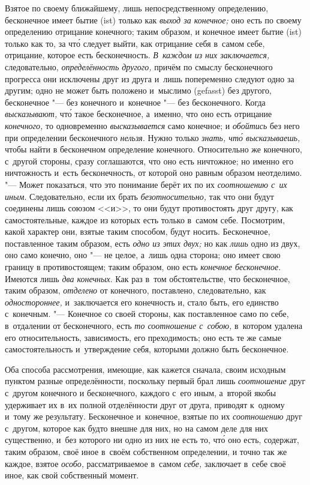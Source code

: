 Взятое по своему ближайшему, лишь непосредственному определению, бесконечное
имеет бытие (ist) только как {\em выход за конечное;}
оно есть по своему определению отрицание конечного; таким образом, и
конечное имеет бытие (ist) только как то, за чт\'{о} следует выйти, как
отрицание себя в~самом себе, отрицание, которое есть бесконечность.
{\em В~каждом из них заключается,} следовательно,
{\em определённость другого,} причём по смыслу
бесконечного прогресса они исключены друг из друга и~лишь попеременно
следуют одно за другим; одно не может быть положено и~мыслимо (gefasst) без
другого, бесконечное "--- без конечного и~конечное "--- без бесконечного. Когда
{\em высказывают,} чт\'{о} такое бесконечное, а~именно, что
оно есть отрицание {\em конечного,} то одновременно
{\em высказывается} само конечное; и
{\em обойтись} без него при определении бесконечного
{\em нельзя}. Нужно только
{\em знать, чт\'{о} высказываешь,} чтобы найти в
бесконечном определение конечного. Относительно же конечного, с~другой
стороны, сразу соглашаются, что оно есть ничтожное; но именно его
ничтожность и~есть бесконечность, от которой оно равным образом неотделимо.
"--- Может показаться, что это понимание берёт их по их
{\em соотношению с~их иным}. Следовательно, если их
брать {\em безотносительно,} так что они будут
соединены лишь союзом <<и>>, то они будут противостоять друг другу, как
самостоятельные, каждое из которых есть только в~самом себе. Посмотрим,
какой характер они, взятые таким способом, будут носить. Бесконечное,
поставленное таким образом, есть {\em одно из этих
двух;} но как {\em лишь} одно из двух, оно само
конечно, оно "--- не целое, а~лишь одна сторона; оно имеет свою границу в
противостоящем; таким образом, оно есть {\em конечное
бесконечное}. Имеются лишь {\em два конечных}. Как раз
в~том обстоятельстве, что бесконечное, таким образом,
{\em отделено} от конечного, поставлено, следовательно,
как {\em одностороннее,} и~заключается его конечность
и, стало быть, его единство с~конечным. "--- Конечное со своей стороны, как
поставленное само по себе, в~отдалении от бесконечного, есть
{\em то соотношение с~собою,} в~котором удалена его
относительность, зависимость, его преходимость; оно есть те же самые
самостоятельность и~утверждение себя, которыми должно быть бесконечное.

Оба способа рассмотрения, имеющие, как кажется сначала, своим исходным
пунктом разные определённости, поскольку первый брал лишь
{\em соотношение} друг с~другом конечного и
бесконечного, каждого с~его иным, а~второй якобы удерживает их в~их
полной отделённости друг от друга, приводят к~одному и~тому же результату.
Бесконечное и~конечное, взятые по их {\em соотношению}
друг с~другом, которое как будто внешне для них, но на самом деле для них
существенно, и~без которого ни одно из них не есть то, чт\'{о} оно есть,
содержат, таким образом, своё иное в~своём собственном определении, и
точно так же каждое, взятое {\em особо,}
рассматриваемое в~самом {\em себе,} заключает в~себе
своё иное, как свой собственный момент.

